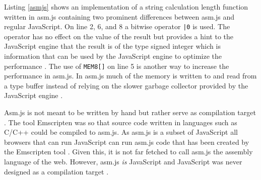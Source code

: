 

Listing \ref{asmjs} shows an implementation of a string calculation length function written in asm.js containing two prominent differences between asm.js and regular JavaScript. On line 2, 6, and 8 a bitwise operator \texttt{|0} is used. The operator has no effect on the value of the result but provides a hint to the JavaScript engine that the result is of the type signed integer which is information that can be used by the JavaScript engine to optimize the performance \parencite{Zakai2018}. The use of \texttt{MEM8[]} on line 5 is another way to increase the performance in asm.js. In asm.js much of the memory is written to and read from a type buffer instead of relying on the slower garbage collector provided by the JavaScript engine \parencite{Zakai2011}.

Asm.js is not meant to be written by hand but rather serve as compilation target \parencite{VanEsNicolayStievenartDHondtDeRoover2016}. The tool Emscripten \parencite{Zakai2011} was so that source code written in languages such as C/C++ could be compiled to asm.js. As asm.js is a subset of JavaScript all browsers that can run JavaScript can run asm.js code that has been created by the Emscripten tool \parencite{HaasRossbergSchuffTitzerHolmanGohmanWagnerZakaiBastien2017}. Given this, it is not far fetched to call asm.js the assembly language of the web. However, asm.js \emph{is} JavaScript and JavaScript was never designed as a compilation target \parencite{Watt2018}.
